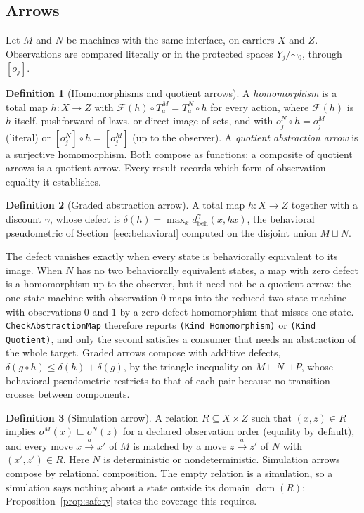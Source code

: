 \documentclass[11pt]{article}
\newcommand{\code}[1]{\texttt{#1}}
\newcommand{\dom}{\operatorname{dom}}
\newcommand{\dbeh}{d_{\mathrm{beh}}}
\theoremstyle{definition}
\newtheorem{definition}{Definition}[section]
\theoremstyle{plain}
\begin{document}
\subsection{Arrows}\label{sec:arrows}

Let $M$ and $N$ be machines with the same interface, on carriers $X$ and $Z$. Observations are
compared literally or in the protected spaces $Y_j/{\sim_0}$, through $[o_j]$.

\begin{definition}[Homomorphisms and quotient arrows]\label{def:exact}
A \emph{homomorphism} is a total map $h:X\to Z$ with $\mathcal F(h)\circ T^M_a=T^N_a\circ h$ for
every action, where $\mathcal F(h)$ is $h$ itself, pushforward of laws, or direct image of sets,
and with $o^N_j\circ h=o^M_j$ (literal) or $[o^N_j]\circ h=[o^M_j]$ (up to the observer). A
\emph{quotient abstraction arrow} is a surjective homomorphism. Both compose as functions; a
composite of quotient arrows is a quotient arrow. Every result records which form of observation
equality it establishes.
\end{definition}

\begin{definition}[Graded abstraction arrow]\label{def:gradedarrow}
A total map $h:X\to Z$ together with a discount $\gamma$, whose defect is
$\delta(h)=\max_x \dbeh^{\gamma}(x,hx)$, the behavioral pseudometric of
Section~\ref{sec:behavioral} computed on the disjoint union $M\sqcup N$.
\end{definition}

The defect vanishes exactly when every state is behaviorally equivalent to its image. When $N$
has no two behaviorally equivalent states, a map with zero defect is a homomorphism up to the
observer, but it need not be a quotient arrow: the one-state machine with observation $0$ maps
into the reduced two-state machine with observations $0$ and $1$ by a zero-defect homomorphism
that misses one state. \code{CheckAbstractionMap} therefore reports \code{(Kind Homomorphism)} or
\code{(Kind Quotient)}, and only the second satisfies a consumer that needs an abstraction of the
whole target. Graded arrows compose with additive defects, $\delta(g\circ h)\le\delta(h)+\delta(g)$,
by the triangle inequality on $M\sqcup N\sqcup P$, whose behavioral pseudometric restricts to that
of each pair because no transition crosses between components.

\begin{definition}[Simulation arrow]\label{def:simulation}
A relation $R\subseteq X\times Z$ such that $(x,z)\in R$ implies $o^M(x)\sqsubseteq o^N(z)$ for
a declared observation order (equality by default), and every move $x\xrightarrow{a}x'$ of $M$
is matched by a move $z\xrightarrow{a}z'$ of $N$ with $(x',z')\in R$. Here $N$ is deterministic
or nondeterministic. Simulation arrows compose by relational composition. The empty relation is a
simulation, so a simulation says nothing about a state outside its domain $\dom(R)$;
Proposition~\ref{prop:safety} states the coverage this requires.
\end{definition}
\end{document}
